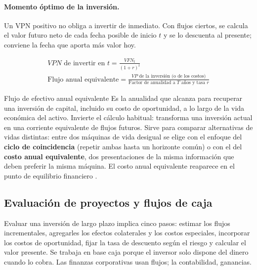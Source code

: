 \paragraph{Momento óptimo de la inversión.} Un VPN positivo no obliga a invertir de inmediato. Con flujos ciertos, se calcula el valor futuro neto de cada fecha posible de inicio $t$ y se lo descuenta al presente; conviene la fecha que aporta más valor hoy.

\begin{formulaBox}
\[
\begin{gathered}
VPN \text{ de invertir en } t = \frac{VFN_t}{(1+r)^{t}}
\\[4pt]
\text{Flujo anual equivalente} = \frac{VP \text{ de la inversión (o de los costos)}}{\text{Factor de anualidad a } T \text{ años y tasa } r}
\end{gathered}
\]
\end{formulaBox}

\begin{definicion}{Flujo de efectivo anual equivalente}
Es la anualidad que alcanza para recuperar una inversión de capital, incluido su costo de oportunidad, a lo largo de la vida económica del activo. Invierte el cálculo habitual: transforma una inversión actual en una corriente equivalente de flujos futuros. Sirve para comparar alternativas de vidas distintas: entre dos máquinas de vida desigual se elige con el enfoque del \textbf{ciclo de coincidencia} (repetir ambas hasta un horizonte común) o con el del \textbf{costo anual equivalente}, dos presentaciones de la misma información que deben preferir la misma máquina. El costo anual equivalente reaparece en el punto de equilibrio financiero .
\end{definicion}

\subsection{Evaluación de proyectos y flujos de caja}

Evaluar una inversión de largo plazo implica cinco pasos: estimar los flujos incrementales, agregarles los efectos colaterales y los costos especiales, incorporar los costos de oportunidad, fijar la tasa de descuento según el riesgo y calcular el valor presente. Se trabaja en base caja porque el inversor solo dispone del dinero cuando lo cobra. Las finanzas corporativas usan flujos; la contabilidad, ganancias.

